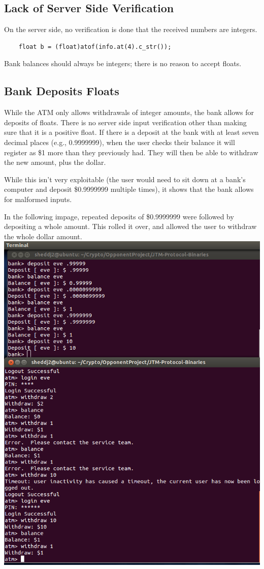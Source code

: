 \documentclass{article}
\begin{document}
\subsection{Lack of Server Side Verification}
On the server side, no verification is done that the received numbers are integers.
\begin{lstlisting}
    float b = (float)atof(info.at(4).c_str());
\end{lstlisting}
Bank balances should always be integers; there is no reason to accept floats.

\subsection{Bank Deposits Floats}
While the ATM only allows withdrawals of integer amounts, the bank allows for deposits of floats. There is no server side input verification other than making sure that it is a positive float. If there is a deposit at the bank with at least seven decimal places (e.g., 0.9999999), when the user checks their balance it will register as \$1 more than they previously had. They will then be able to withdraw the new amount, plus the dollar.

While this isn't very exploitable (the user would need to sit down at a bank's computer and deposit \$0.9999999 multiple times), it shows that the bank allows for malformed inputs.

In the following impage, repeated deposits of \$0.9999999 were followed by depositing a whole amount. This rolled it over, and allowed the user to withdraw the whole dollar amount.
\\
\includegraphics[scale=0.5]{StrangeFloatBehavior.png}
\\
\end{document}
